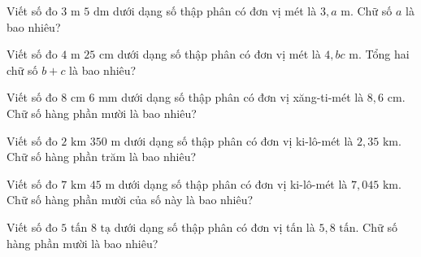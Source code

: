 
\begin{ex}
  Viết số đo $3\text{ m } 5\text{ dm}$ dưới dạng số thập phân có đơn vị mét là $3{,}a\text{ m}$. Chữ số $a$ là bao nhiêu?
\end{ex}

\begin{ex}
  Viết số đo $4\text{ m } 25\text{ cm}$ dưới dạng số thập phân có đơn vị mét là $4{,}bc\text{ m}$. Tổng hai chữ số $b + c$ là bao nhiêu?
\end{ex}

\begin{ex}
  Viết số đo $8\text{ cm } 6\text{ mm}$ dưới dạng số thập phân có đơn vị xăng-ti-mét là $8{,}6\text{ cm}$. Chữ số hàng phần mười là bao nhiêu?
\end{ex}

\begin{ex}
  Viết số đo $2\text{ km } 350\text{ m}$ dưới dạng số thập phân có đơn vị ki-lô-mét là $2{,}35\text{ km}$. Chữ số hàng phần trăm là bao nhiêu?
\end{ex}

\begin{ex}
  Viết số đo $7\text{ km } 45\text{ m}$ dưới dạng số thập phân có đơn vị ki-lô-mét là $7{,}045\text{ km}$. Chữ số hàng phần mười của số này là bao nhiêu?
\end{ex}

\begin{ex}
  Viết số đo $5\text{ tấn } 8\text{ tạ}$ dưới dạng số thập phân có đơn vị tấn là $5{,}8\text{ tấn}$. Chữ số hàng phần mười là bao nhiêu?
\end{ex}

